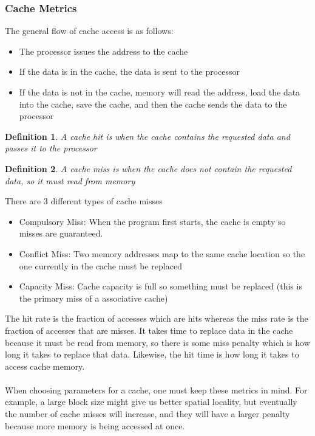 \documentclass{article}
\newtheorem{definition}{Definition}
\begin{document}
\subsubsection{Cache Metrics}
The general flow of cache access is as follows:
\begin{itemize}
    \item[1.] The processor issues the address to the cache
    \item[2.] If the data is in the cache, the data is sent to the processor
    \item[3.] If the data is not in the cache, memory will read the address, load the data into the cache, save the cache, and then the cache sends the data to the processor  
\end{itemize}
\begin{definition}
    A cache hit is when the cache contains the requested data and passes it to the processor
\end{definition}
\begin{definition}
    A cache miss is when the cache does not contain the requested data, so it must read from memory
\end{definition}
There are 3 different types of cache misses
\begin{itemize}
    \item Compulsory Miss: When the program first starts, the cache is empty so misses are guaranteed.
    \item Conflict Miss: Two memory addresses map to the same cache location so the one currently in the cache must be replaced
    \item Capacity Miss: Cache capacity is full so something must be replaced (this is the primary miss of a associative cache)
\end{itemize}
The hit rate is the fraction of accesses which are hits whereas the miss rate is the fraction of accesses that are misses.
It takes time to replace data in the cache because it must be read from memory, so there is some miss penalty which is how long it takes to replace that data.
Likewise, the hit time is how long it takes to access cache memory.\\\\
When choosing parameters for a cache, one must keep these metrics in mind. For example, a large block size might give us better spatial locality, but eventually
the number of cache misses will increase, and they will have a larger penalty because more memory is being accessed at once.
\end{document}
